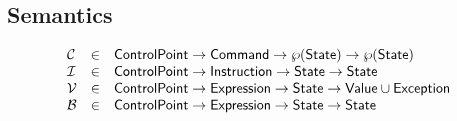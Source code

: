 \documentclass{article}
\newcommand{\SF}[1]{\mbox{\textsf{#1}}}
\newcommand{\Command}{\SF{Command}}
\newcommand{\State}{\SF{State}}
\newcommand{\Value}{\SF{Value}}
\newcommand{\N}{\mathcal{C}}
\newcommand{\B}{\mathcal{B}}
\newcommand{\I}{\mathcal{I}}
\newcommand{\V}{\mathcal{V}}
\newcommand{\powerset}[1]{\wp(#1)}
\begin{document}
\newpage
\subsection{Semantics}
\[
\begin{array}{lcl}
  \N & \in & \SF{ControlPoint} \rightarrow \Command \rightarrow \powerset{\State} \rightarrow \powerset{\State} \\
  \I & \in & \SF{ControlPoint} \rightarrow \SF{Instruction} \rightarrow \State \rightarrow \State \\
  \V & \in & \SF{ControlPoint} \rightarrow \SF{Expression} \rightarrow \State \rightarrow \Value \cup \SF{Exception}\\
  \B & \in & \SF{ControlPoint} \rightarrow \SF{Expression} \rightarrow \State \rightarrow \State \\
\end{array}
\]
\end{document}
